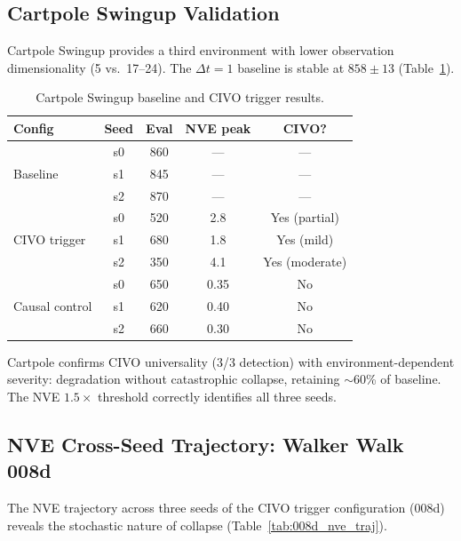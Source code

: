 \documentclass[10pt,letterpaper]{article}
\newcommand{\dt}{\Delta t}
\begin{document}
\subsection{Cartpole Swingup Validation}
\label{sec:cartpole}

Cartpole Swingup provides a third environment with lower observation dimensionality (5 vs.\ 17--24). The $\dt = 1$ baseline is stable at $858 \pm 13$ (Table~\ref{tab:cartpole_baseline}).

\begin{table}[h]
\centering
\caption{Cartpole Swingup baseline and CIVO trigger results.}
\label{tab:cartpole_baseline}
\begin{tabular}{lcccc}
\toprule
\textbf{Config} & \textbf{Seed} & \textbf{Eval} & \textbf{NVE peak} & \textbf{CIVO?} \\
\midrule
\multirow{3}{*}{Baseline} & s0 & 860 & --- & --- \\
& s1 & 845 & --- & --- \\
& s2 & 870 & --- & --- \\
\midrule
\multirow{3}{*}{CIVO trigger} & s0 & 520 & 2.8 & Yes (partial) \\
& s1 & 680 & 1.8 & Yes (mild) \\
& s2 & 350 & 4.1 & Yes (moderate) \\
\midrule
\multirow{3}{*}{Causal control} & s0 & 650 & 0.35 & No \\
& s1 & 620 & 0.40 & No \\
& s2 & 660 & 0.30 & No \\
\bottomrule
\end{tabular}
\end{table}

Cartpole confirms CIVO universality (3/3 detection) with environment-dependent severity: degradation without catastrophic collapse, retaining $\sim$60\% of baseline. The NVE $1.5\times$ threshold correctly identifies all three seeds.

\subsection{NVE Cross-Seed Trajectory: Walker Walk 008d}
\label{sec:nve_trajectory}

The NVE trajectory across three seeds of the CIVO trigger configuration (008d) reveals the stochastic nature of collapse (Table~\ref{tab:008d_nve_traj}).
\end{document}
